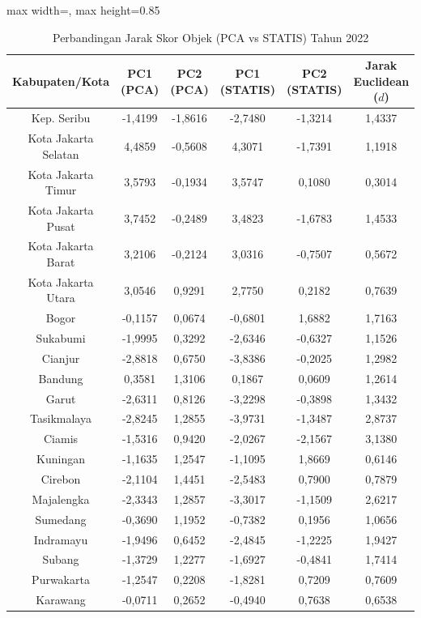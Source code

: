 \begin{table}[H]
\centering
\caption{Perbandingan Jarak Skor Objek (PCA vs STATIS) Tahun 2022} \label{tab:app2jarak_skor_2022}
\begin{adjustbox}{max width=\textwidth, max height=0.85\textheight}
\begin{tabular}{|c|c|c|c|c|c|}
\hline
\textbf{Kabupaten/Kota} & \textbf{PC1 (PCA)} & \textbf{PC2 (PCA)} & \textbf{PC1 (STATIS)} & \textbf{PC2 (STATIS)} & \textbf{Jarak Euclidean ($d$)} \\
\hline
Kep. Seribu & -1,4199 & -1,8616 & -2,7480 & -1,3214 & 1,4337 \\
Kota Jakarta Selatan & 4,4859 & -0,5608 & 4,3071 & -1,7391 & 1,1918 \\
Kota Jakarta Timur & 3,5793 & -0,1934 & 3,5747 & 0,1080 & 0,3014 \\
Kota Jakarta Pusat & 3,7452 & -0,2489 & 3,4823 & -1,6783 & 1,4533 \\
Kota Jakarta Barat & 3,2106 & -0,2124 & 3,0316 & -0,7507 & 0,5672 \\
Kota Jakarta Utara & 3,0546 & 0,9291 & 2,7750 & 0,2182 & 0,7639 \\
Bogor & -0,1157 & 0,0674 & -0,6801 & 1,6882 & 1,7163 \\
Sukabumi & -1,9995 & 0,3292 & -2,6346 & -0,6327 & 1,1526 \\
Cianjur & -2,8818 & 0,6750 & -3,8386 & -0,2025 & 1,2982 \\
Bandung & 0,3581 & 1,3106 & 0,1867 & 0,0609 & 1,2614 \\
Garut & -2,6311 & 0,8126 & -3,2298 & -0,3898 & 1,3432 \\
Tasikmalaya & -2,8245 & 1,2855 & -3,9731 & -1,3487 & 2,8737 \\
Ciamis & -1,5316 & 0,9420 & -2,0267 & -2,1567 & 3,1380 \\
Kuningan & -1,1635 & 1,2547 & -1,1095 & 1,8669 & 0,6146 \\
Cirebon & -2,1104 & 1,4451 & -2,5483 & 0,7900 & 0,7879 \\
Majalengka & -2,3343 & 1,2857 & -3,3017 & -1,1509 & 2,6217 \\
Sumedang & -0,3690 & 1,1952 & -0,7382 & 0,1956 & 1,0656 \\
Indramayu & -1,9496 & 0,6452 & -2,4845 & -1,2225 & 1,9427 \\
Subang & -1,3729 & 1,2277 & -1,6927 & -0,4841 & 1,7414 \\
Purwakarta & -1,2547 & 0,2208 & -1,8281 & 0,7209 & 0,7609 \\
Karawang & -0,0711 & 0,2652 & -0,4940 & 0,7638 & 0,6538 \\

\end{tabular}
\end{adjustbox}
\end{table}
